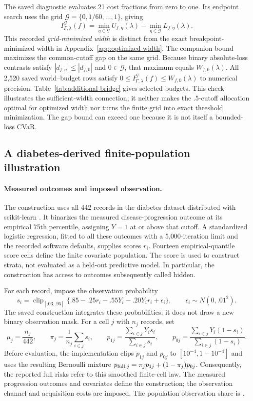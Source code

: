 The saved diagnostic evaluates 21 cost fractions from zero to one. Its endpoint
search uses the grid
$\mathcal G=\{0,1/60,\ldots,1\}$, giving
\[
 I^{\mathcal G}_{\Gamma,\lambda}(f)
 =\min_{\eta\in\mathcal G}U_{f,\eta}(\lambda)
  -\min_{\eta\in\mathcal G}L_{f,\eta}(\lambda).
\]
This recorded \emph{grid-minimized width} is distinct from the exact
breakpoint-minimized width in Appendix~\ref{app:optimized-width}. The companion
bound maximizes the common-cutoff gap on the same grid. Because binary
absolute-loss contrasts satisfy $|d_{f,\eta}|\leq|d_{f,0}|$ and $0\in\mathcal G$,
that maximum equals $W_{f,0}(\lambda)$. All 2,520 saved world--budget rows satisfy
$0\leq I^{\mathcal G}_{\Gamma,\lambda}(f)\leq W_{f,0}(\lambda)$ to numerical
precision. Table~\ref{tab:additional-bridge} gives selected budgets. This check
illustrates the sufficient-width connection; it neither makes the $.5$-cutoff
allocation optimal for optimized width nor turns the finite grid into exact
threshold minimization. The gap bound can exceed one because it is not itself
a bounded-loss CVaR.

\subsection{A diabetes-derived finite-population illustration}
\label{app:additional-diabetes}

\paragraph{Measured outcomes and imposed observation.}
The construction uses all 442 records in the diabetes dataset distributed with
scikit-learn \citep{pedregosa2011scikit}. It binarizes the measured disease-progression
outcome at its empirical 75th percentile, assigning $Y=1$ at or above that
cutoff. A standardized logistic regression, fitted to all these outcomes with a
5,000-iteration limit and the recorded software defaults, supplies scores $r_i$.
Fourteen empirical-quantile score cells define the finite covariate population.
The score is used to construct strata, not evaluated as a held-out predictive
model. In particular, the construction has access to outcomes subsequently
called hidden.

For each record, impose the observation probability
\[
 s_i=\operatorname{clip}_{[.03,.95]}
 \{.85-.25r_i-.55Y_i-.20Y_i r_i+\epsilon_i\},
 \qquad \epsilon_i\sim N(0,.01^2).
\]
The saved construction integrates these probabilities; it does not draw a new
binary observation mask. For a cell $j$ with $n_j$ records, set
\[
 \mu_j=\frac{n_j}{442},\qquad
 \pi_j=\frac{1}{n_j}\sum_{i\in j}s_i,\qquad
 p_{1j}=\frac{\sum_{i\in j}Y_i s_i}{\sum_{i\in j}s_i},\qquad
 p_{0j}=\frac{\sum_{i\in j}Y_i(1-s_i)}{\sum_{i\in j}(1-s_i)}.
\]
Before evaluation, the implementation clips $p_{1j}$ and $p_{0j}$ to
$[10^{-4},1-10^{-4}]$ and uses the resulting Bernoulli mixture
$p_{{\rm full},j}=\pi_jp_{1j}+(1-\pi_j)p_{0j}$. Consequently, the reported full
risks refer to this smoothed finite-cell law. The measured progression outcomes
and covariates define the construction; the observation channel and acquisition
costs are imposed. The population observation share is
\AdditionalDiabetesSelected{}.

